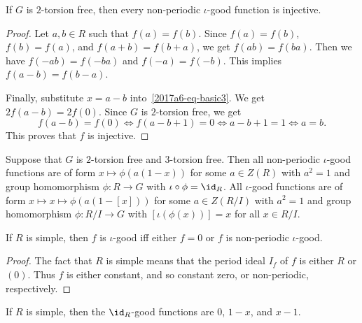 \begin{lemma}\label{2017a6-nonperiodic-2tf}
If $G$ is $2$-torsion free, then every non-periodic $\iota$-good function is injective.
\end{lemma}
\begin{proof}
Let $a, b \in R$ such that $f(a) = f(b)$.
Since $f(a) = f(b)$, $f(b) = f(a)$, and $f(a + b) = f(b + a)$, we get $f(ab) = f(ba)$.
Then we have $f(-ab) = f(-ba)$ and $f(-a) = f(-b)$.
This implies $f(a - b) = f(b - a)$.

Finally, substitute $x = a - b$ into~\eqref{2017a6-eq-basic3}.
We get $2 f(a - b) = 2 f(0)$.
Since $G$ is $2$-torsion free, we get
\[ f(a - b) = f(0) \iff f(a - b + 1) = 0 \iff a - b + 1 = 1 \iff a = b. \]
This proves that $f$ is injective.
\end{proof}

\begin{corollary}
Suppose that $G$ is $2$-torsion free and $3$-torsion free.
Then all non-periodic $\iota$-good functions are of form $x \mapsto \phi(a(1 - x))$ for some $a \in Z(R)$ with $a^2 = 1$ and group homomorphism $\phi : R \to G$ with $\iota \circ \phi = \id_R$.
All $\iota$-good functions are of form $x \mapsto x \mapsto \phi(a(1 - [x]))$ for some $a \in Z(R/I)$ with $a^2 = 1$ and group homomorphism $\phi : R/I \to G$ with $[\iota(\phi(x))] = x$ for all $x \in R/I$.
\end{corollary}

\begin{lemma}\label{2017a6-good-simple-ring-case}
If $R$ is simple, then $f$ is $\iota$-good iff either $f = 0$ or $f$ is non-periodic $\iota$-good.
\end{lemma}
\begin{proof}
The fact that $R$ is simple means that the period ideal $I_f$ of $f$ is either $R$ or $(0)$.
Thus $f$ is either constant, and so constant zero, or non-periodic, respectively.
\end{proof}

\begin{corollary}
If $R$ is simple, then the $\id_R$-good functions are $0$, $1 - x$, and $x - 1$.
\end{corollary}

